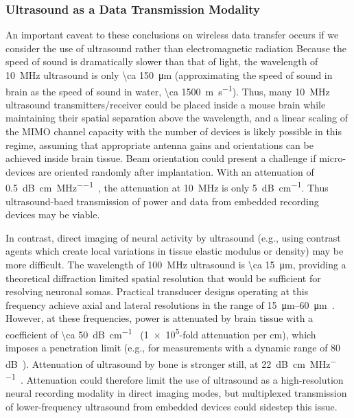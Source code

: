 \subsubsection{Ultrasound as a Data Transmission Modality}
An important caveat to these conclusions on wireless data transfer occurs if we consider the use of ultrasound rather than electromagnetic radiation
Because the speed of sound is dramatically slower than that of light, the wavelength of \SI{10}{\mega\hertz} ultrasound is only \SI{\ca 150}{\micro\meter} (approximating the speed of sound in brain as the speed of sound in water, \SI{\ca 1500}{\meter\per\second}).
Thus, many \SI{10}{\mega\hertz} ultrasound transmitters/receiver could be placed inside a mouse brain while maintaining their spatial separation above the wavelength, and a linear scaling of the MIMO channel capacity with the number of devices is likely possible in this regime, assuming that appropriate antenna gains and orientations can be achieved inside brain tissue. Beam orientation could present a challenge if micro-devices are oriented randomly after implantation.
With an attenuation of \SI{0.5}{\dB\per\centi\meter\per\mega\hertz}~\cite{hoskins10}, the attenuation at \SI{10}{\mega\hertz} is only \SI{5}{\dB\per\centi\meter}.
Thus ultrasound-baed transmission of power and data from embedded recording devices may be viable.

In contrast, direct imaging of neural activity by ultrasound (e.g., using contrast agents which create local variations in tissue elastic modulus or density) may be more difficult.
The wavelength of \SI{100}{\mega\hertz} ultrasound is \SI{\ca 15}{\micro\meter}, providing a theoretical diffraction limited spatial resolution that would be sufficient for resolving neuronal somas.
Practical transducer designs operating at this frequency achieve axial and lateral resolutions in the range of \SIrange{15}{60}{\um}~\cite{foster00}.
However, at these frequencies, power is attenuated by brain tissue with a coefficient of \SI{\ca 50}{\dB\per\centi\meter}~\cite{hoskins10} (\num{1e5}-fold attenuation per cm), which imposes a penetration limit (e.g., for
measurements with a dynamic range of 80 dB~\cite{foster00}).
Attenuation of ultrasound by bone is stronger still, at \SI{22}{\dB\per\cm\per\MHz}~\cite{hoskins10}.
Attenuation could therefore limit the use of ultrasound as a high-resolution neural recording modality in direct imaging modes, but multiplexed transmission of lower-frequency ultrasound from embedded devices could sidestep this issue.

